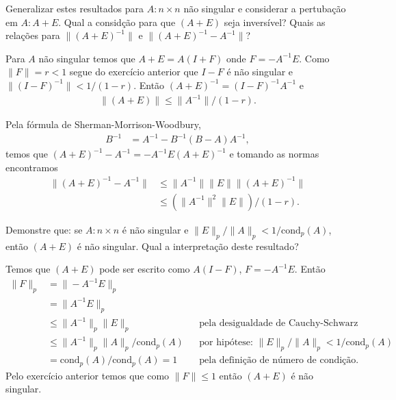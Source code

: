 \begin{questions}
     Generalizar estes resultados para $A : n \times n$ n\~{a}o singular e considerar a pertuba\c{c}\~{a}o em $A : A + E$. Qual a consid\c{c}\~{a}o para que $\left( A + E \right)$ seja invers\'{i}vel? Quais as rela\c{c}\~{o}es para $\| \left( A + E \right)^{-1} \|$ e $\| \left( A + E \right)^{-1} - A^{-1} \|$?
    \begin{solution}
        Para $A$ n\~{a}o singular temos que $A + E = A\left( I + F \right)$ onde $F = - A^{-1}E$. Como $\| F \| = r < 1$ segue do exerc\'{i}cio anterior que $I - F$ \'{e} n\~{a}o singular e $\| \left( I - F \right)^{-1} \| < 1 / \left( 1 - r \right)$. Ent\~{a}o $\left( A + E \right)^{-1} = \left( I - F \right)^{-1} A^{-1}$ e
        \begin{align*}
            \| \left( A + E \right) \| \leq \| A^{-1} \| / \left( 1 - r \right).
        \end{align*}

        Pela f\'{o}rmula de Sherman-Morrison-Woodbury,
        \begin{align*}
            B^{-1} &= A^{-1} - B^{-1} \left( B - A \right) A^{-1},
        \end{align*}
        temos que $\left( A + E \right)^{-1} - A^{-1} = - A^{-1} E \left( A + E \right)^{-1}$ e tomando as normas encontramos
        \begin{align*}
            \| \left( A + E \right)^{-1} - A^{-1} \| &\leq \| A^{-1} \| \| E \| \| \left( A + E \right)^{-1} \| \\
            &\leq \left( \| A^{-1} \|^2 \| E \| \right) / \left( 1 - r \right).
        \end{align*}
    \end{solution}

    \question Demonstre que: se $A : n \times n$ \'{e} n\~{a}o singular e $\| E \|_p / \| A \|_p < 1 / \text{cond}_p (A)$, ent\~{a}o $(A + E)$ \'{e} n\~{a}o singular. Qual a interpreta\c{c}\~{a}o deste resultado?
    \begin{solution}
        Temos que $\left( A + E \right)$ pode ser escrito como $A \left( I - F \right)$, $F = - A^{-1} E$. Ent\~{a}o
        \begin{align*}
            \| F \|_p &= \| - A^{-1} E \|_p \\
            &= \| A^{-1} E \|_p \\
            &\leq \| A^{-1} \|_p \| E \|_p && \text{pela desigualdade de Cauchy-Schwarz} \\
            &\leq \| A^{-1} \|_p \| A \|_p / \text{cond}_p (A) && \text{por hip\'{o}tese: $\| E \|_p / \| A \|_p < 1 / \text{cond}_p (A)$} \\
            &= \text{cond}_p (A) / \text{cond}_p (A) = 1 && \text{pela defini\c{c}\~{a}o de n\'{u}mero de condi\c{c}\~{a}o}.
        \end{align*}
        Pelo exerc\'{i}cio anterior temos que como $\| F \| \leq 1$ ent\~{a}o $\left( A + E \right)$ \'{e} n\~{a}o singular.


\end{solution}
\end{questions}
